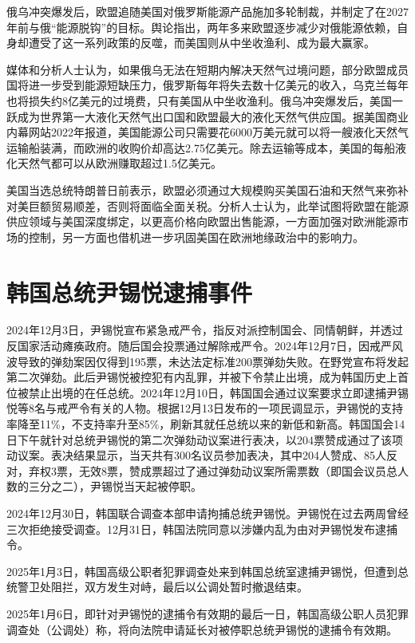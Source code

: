 俄乌冲突爆发后，欧盟追随美国对俄罗斯能源产品施加多轮制裁，并制定了在2027年前与俄“能源脱钩”的目标。舆论指出，两年多来欧盟逐步减少对俄能源依赖，自身却遭受了这一系列政策的反噬，而美国则从中坐收渔利、成为最大赢家。

媒体和分析人士认为，如果俄乌无法在短期内解决天然气过境问题，部分欧盟成员国将进一步受到能源短缺压力，俄罗斯每年将失去数十亿美元的收入，乌克兰每年也将损失约8亿美元的过境费，只有美国从中坐收渔利。俄乌冲突爆发后，美国一跃成为世界第一大液化天然气出口国和欧盟最大的液化天然气供应国。据美国商业内幕网站2022年报道，美国能源公司只需要花6000万美元就可以将一艘液化天然气运输船装满，而欧洲的收购价却高达2.75亿美元。除去运输等成本，美国的每船液化天然气都可以从欧洲赚取超过1.5亿美元。

美国当选总统特朗普日前表示，欧盟必须通过大规模购买美国石油和天然气来弥补对美巨额贸易顺差，否则将面临全面关税。分析人士认为，此举试图将欧盟在能源供应领域与美国深度绑定，以更高价格向欧盟出售能源，一方面加强对欧洲能源市场的控制，另一方面也借机进一步巩固美国在欧洲地缘政治中的影响力。

\section{韩国总统尹锡悦逮捕事件}

2024年12月3日，尹锡悦宣布紧急戒严令，指反对派控制国会、同情朝鲜，并透过反国家活动瘫痪政府。随后国会投票通过解除戒严令。2024年12月7日，因戒严风波导致的弹劾案因仅得到195票，未达法定标准200票弹劾失败。在野党宣布将发起第二次弹劾。此后尹锡悦被控犯有内乱罪，并被下令禁止出境，成为韩国历史上首位被禁止出境的在任总统。2024年12月10日，韩国国会通过议案要求立即逮捕尹锡悦等8名与戒严令有关的人物。根据12月13日发布的一项民调显示，尹锡悦的支持率降至11\%，不支持率升至85\%，刷新其就任总统以来的新低和新高。韩国国会14日下午就针对总统尹锡悦的第二次弹劾动议案进行表决，以204票赞成通过了该项动议案。表决结果显示，当天共有300名议员参加表决，其中204人赞成、85人反对，弃权3票，无效8票，赞成票超过了通过弹劾动议案所需票数（即国会议员总人数的三分之二），尹锡悦当天起被停职。

2024年12月30日，韩国联合调查本部申请拘捕总统尹锡悦。尹锡悦在过去两周曾经三次拒绝接受调查。12月31日，韩国法院同意以涉嫌内乱为由对尹锡悦发布逮捕令。

2025年1月3日，韩国高级公职者犯罪调查处来到韩国总统室逮捕尹锡悦，但遭到总统警卫处阻拦，双方发生对峙，最后以公调处暂时撤退结束。

2025年1月6日，即针对尹锡悦的逮捕令有效期的最后一日，韩国高级公职人员犯罪调查处（公调处）称，将向法院申请延长对被停职总统尹锡悦的逮捕令有效期。